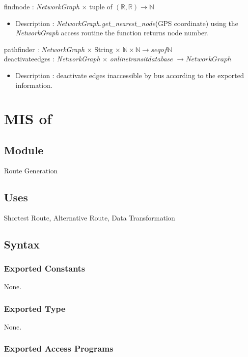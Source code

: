 \documentclass[12pt, titlepage]{article}
\begin{document}
findnode : \emph{NetworkGraph} $\times$ tuple of $(\mathbb{R}, \mathbb{R})  \rightarrow \mathbb{N}$
\begin{itemize}
    \item Description : \emph{NetworkGraph.get\_nearest\_node}(GPS coordinate) using the \emph{NetworkGraph} access routine the function returns node number.
\end{itemize}
pathfinder : \emph{NetworkGraph} $\times$ String $\times$ $\mathbb{N} \times \mathbb{N}  \rightarrow seq of \mathbb{N}$\\
deactivateedges : \emph{NetworkGraph} $\times$ \emph{onlinetransitdatabase} $ \rightarrow NetworkGraph$
\begin{itemize}
    \item Description : deactivate edges inaccessible by bus according to the exported information.
\end{itemize}
\newpage

\section{MIS of } \label{ModuleSPath} 

\subsection{Module} 
Route Generation

\subsection{Uses}%
Shortest Route, Alternative Route, Data Transformation

\subsection{Syntax}

\subsubsection{Exported Constants}
None.

\subsubsection{Exported Type}
None.

\subsubsection{Exported Access Programs}
\end{document}
